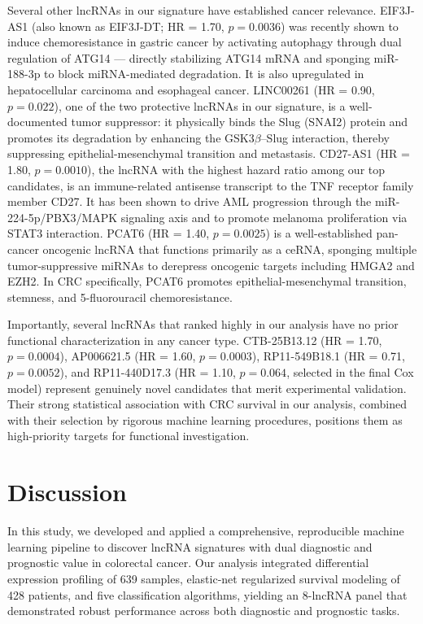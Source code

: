 \documentclass[fleqn,10pt]{wlscirep}
\begin{document}
Several other lncRNAs in our signature have established cancer relevance. EIF3J-AS1 (also known as EIF3J-DT; HR = 1.70, $p = 0.0036$) was recently shown to induce chemoresistance in gastric cancer by activating autophagy through dual regulation of ATG14 --- directly stabilizing ATG14 mRNA and sponging miR-188-3p to block miRNA-mediated degradation\cite{RN22}. It is also upregulated in hepatocellular carcinoma and esophageal cancer. LINC00261 (HR = 0.90, $p = 0.022$), one of the two protective lncRNAs in our signature, is a well-documented tumor suppressor: it physically binds the Slug (SNAI2) protein and promotes its degradation by enhancing the GSK3$\beta$--Slug interaction, thereby suppressing epithelial-mesenchymal transition and metastasis\cite{RN23}. CD27-AS1 (HR = 1.80, $p = 0.0010$), the lncRNA with the highest hazard ratio among our top candidates, is an immune-related antisense transcript to the TNF receptor family member CD27. It has been shown to drive AML progression through the miR-224-5p/PBX3/MAPK signaling axis and to promote melanoma proliferation via STAT3 interaction\cite{RN24}. PCAT6 (HR = 1.40, $p = 0.0025$) is a well-established pan-cancer oncogenic lncRNA that functions primarily as a ceRNA, sponging multiple tumor-suppressive miRNAs to derepress oncogenic targets including HMGA2 and EZH2\cite{RN25}. In CRC specifically, PCAT6 promotes epithelial-mesenchymal transition, stemness, and 5-fluorouracil chemoresistance.

Importantly, several lncRNAs that ranked highly in our analysis have no prior functional characterization in any cancer type. CTB-25B13.12 (HR = 1.70, $p = 0.0004$), AP006621.5 (HR = 1.60, $p = 0.0003$), RP11-549B18.1 (HR = 0.71, $p = 0.0052$), and RP11-440D17.3 (HR = 1.10, $p = 0.064$, selected in the final Cox model) represent genuinely novel candidates that merit experimental validation. Their strong statistical association with CRC survival in our analysis, combined with their selection by rigorous machine learning procedures, positions them as high-priority targets for functional investigation.

\section*{Discussion}

In this study, we developed and applied a comprehensive, reproducible machine learning pipeline to discover lncRNA signatures with dual diagnostic and prognostic value in colorectal cancer. Our analysis integrated differential expression profiling of 639 samples, elastic-net regularized survival modeling of 428 patients, and five classification algorithms, yielding an 8-lncRNA panel that demonstrated robust performance across both diagnostic and prognostic tasks.
\end{document}
